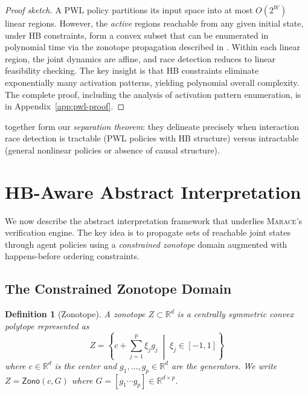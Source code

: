 \documentclass[11pt]{article}
\newtheorem{definition}[theorem]{Definition}
\newcommand{\R}{\mathbb{R}}
\newcommand{\zo}{\mathsf{Zono}}
\newcommand{\marace}{\textsc{Marace}}
\begin{document}
\begin{proof}[Proof sketch]
A PWL policy partitions its input space into at most $O(2^W)$ linear
regions. However, the \emph{active} regions reachable from any given
initial state, under HB constraints, form a convex subset that can be
enumerated in polynomial time via the zonotope propagation described
in . Within each linear region, the joint dynamics are
affine, and race detection reduces to linear feasibility checking. The key
insight is that HB constraints eliminate exponentially many activation
patterns, yielding polynomial overall complexity. The complete proof,
including the analysis of activation pattern enumeration, is in
Appendix~\ref{app:pwl-proof}.
\end{proof}

 together
form our \emph{separation theorem}: they delineate precisely when interaction
race detection is tractable (PWL policies with HB structure) versus intractable
(general nonlinear policies or absence of causal structure).


\section{HB-Aware Abstract Interpretation}
\label{sec:abstract}

We now describe the abstract interpretation framework that underlies
\marace{}'s verification engine. The key idea is to propagate sets of
reachable joint states through agent policies using a \emph{constrained
zonotope} domain augmented with happens-before ordering constraints.

\subsection{The Constrained Zonotope Domain}

\begin{definition}[Zonotope]
A \emph{zonotope} $Z \subset \R^d$ is a centrally symmetric convex polytope
represented as
\[
  Z = \left\{ c + \sum_{j=1}^{p} \xi_j g_j \;\middle|\; \xi_j \in [-1, 1]\right\}
\]
where $c \in \R^d$ is the center and $g_1, \ldots, g_p \in \R^d$ are the
generators. We write $Z = \zo(c, G)$ where $G = [g_1 \cdots g_p] \in \R^{d \times p}$.
\end{definition}
\end{document}
